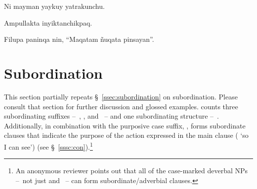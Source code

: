 %
{Ni mayman yaykuy yatrakunchu.}%
{}%
{}{}%

%
{Ampullakta inyiktanchikpaq.}%
{}%
{}{}%

%
{Filupa paninqa nin, “Maqatam ñuqata pinsayan”.}%
{}%
{}{}%

\section{Subordination}
This section partially repeats §~\ref{ssec:subordination} on subordination. Please consult that section for further discussion and glossed examples. \SYQ{} counts three subordinating suffixes --~, , and ~-- and one subordinating structure --~. Additionally, in combination with the purposive case suffix, ,  forms subordinate clauses that indicate the purpose of the action expressed in the main clause ( ‘so I can see’) (see §~\ref{sssc:con}).\footnote{An anonymous reviewer points out that all of the case-marked deverbal NPs --~not just  and ~-- can form subordinate/adverbial clauses.}

